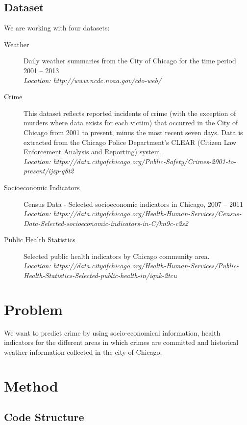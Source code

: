 \documentclass[a4paper,10pt]{article}
\begin{document}
\subsection{Dataset}
We are working with four datasets:
\begin{description}
	\item[Weather] Daily weather summaries from the City of Chicago for the time period 2001 – 2013 \\\textit{Location: http://www.ncdc.noaa.gov/cdo-web/}
	
	\item[Crime] This dataset reflects reported incidents of crime (with the exception of murders where data exists for each victim) that occurred in the City of Chicago from 2001 to present, minus the most recent seven days. Data is extracted from the Chicago Police Department's CLEAR (Citizen Law Enforcement Analysis and Reporting) system. \\\textit{Location: https://data.cityofchicago.org/Public-Safety/Crimes-2001-to-present/ijzp-q8t2}
	
	\item[Socioeconomic Indicators] Census Data - Selected socioeconomic indicators in Chicago, 2007 – 2011 \\\textit{Location: https://data.cityofchicago.org/Health-Human-Services/Census-Data-Selected-socioeconomic-indicators-in-C/kn9c-c2s2}
	
	\item[Public Health Statistics] Selected public health indicators by Chicago community area.\\\textit{Location: https://data.cityofchicago.org/Health-Human-Services/Public-Health-Statistics-Selected-public-health-in/iqnk-2tcu}
	
\end{description}


\section{Problem}
We want to predict crime by using socio-economical information, health indicators for the different areas in which crimes are committed and historical weather information collected in the city of Chicago. 

\section{Method}

\subsection{Code Structure}
\end{document}
